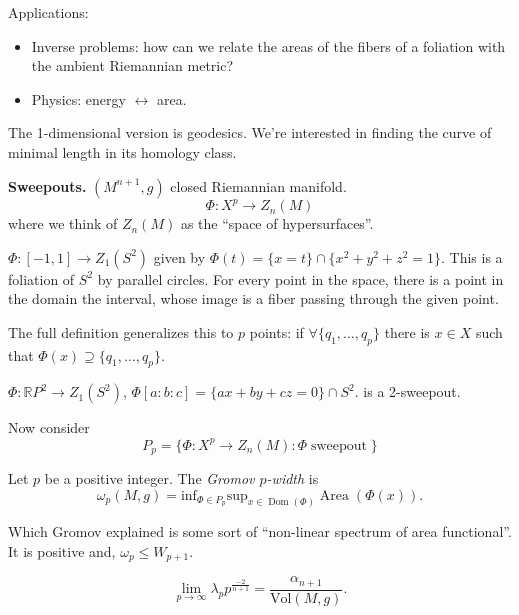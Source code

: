 \noindent
Applications:

\begin{itemize}
\item Inverse problems: how can we
relate the areas of the fibers of a
foliation with the ambient Riemannian
metric?

\item Physics: energy $\leftrightarrow$ area.
\end{itemize}

\noindent
The 1-dimensional version is geodesics.
We're interested in finding the curve
of minimal length in its homology class.

\medskip\noindent
{\bf Sweepouts.}
 $(M^{n+1},g)$ closed Riemannian manifold.
$$
\Phi:X^p \to Z_n(M)
$$
where we think of $Z_n(M)$ as the 
``space of hypersurfaces''.

\begin{example}
\label{example-1-sweepout}
$\Phi:[-1,1] \to Z_1(S^2)$ given by
$\Phi(t) = \{x = t\} \cap\{x^2+y^2+z^2=1\}$.
This is a foliation of $S^2$ by parallel
circles. For every point in the space,
there is a point in the domain
the interval, whose image is a fiber passing
through the given point.
\end{example}

\noindent
The full definition generalizes this
to $p$ points: if $\forall \{q_1,…,q_p\}$
there is $x \in X$ such that $\Phi(x)
\supseteq \{q_1,…,q_p\}$.

\begin{example}
\label{example-rp2-sweepout}
$\Phi:\mathbb{R}P^2 \to Z_1(S^2)$,
$\Phi[a:b:c] = \{ax+by+cz=0\}\cap S^2$.
is a 2-sweepout.
\end{example}

\noindent
Now consider
$$
P_p = \{\Phi:X^p \to Z_n(M):
\Phi \operatorname{sweepout}\}
$$
\begin{definition}
\label{definition-gromov-p-width}
Let $p$ be a positive integer.
The {\it Gromov $p$-width} is
$$
\omega_p(M,g) = \text{inf}_{\Phi \in P_p}
\text{sup}_{x \in \operatorname{Dom}(\Phi)}
\operatorname{Area}(\Phi(x)).
$$
\end{definition}

\noindent
Which Gromov explained is some sort
of ``non-linear spectrum of area
functional''.
It is positive and, $\omega_p \leq W_{p+1}$.

\begin{theorem}
\label{theorem-weyl-sweepouts}
$$
\lim_{p \to \infty}\lambda_p
p^{\frac{-2}{n+1}}
= \frac{\alpha_{n+1}}{\text{Vol}(M,g)}.
$$
\end{theorem}

